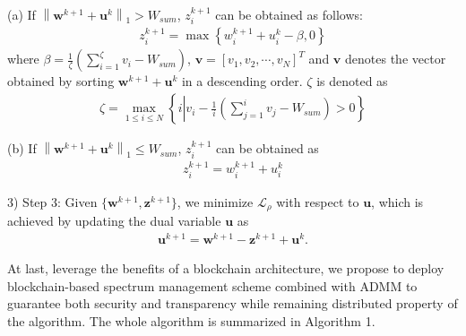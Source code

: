 \documentclass[journal]{IEEEtran}
\begin{document}
(a) If $\left\|\mathbf{w}^{k+1} + \mathbf{u}^k \right\|_1 > W_{sum}$, $z_i^{k+1}$ can be obtained as follows:
\begin{align} \label{q21}
z_i^{k+1} = \max\left\{w_i^{k+1} + u_i^k - \beta, 0\right\}
\end{align}
where $\beta = \frac{1}{\zeta}\left(\sum\limits_{i = 1}^{\zeta} v_i - W_{sum} \right)$, $\mathbf{v} = \left[v_1, v_2, \cdots, v_N\right]^T$ and $\mathbf{v}$ denotes the vector obtained by sorting $\mathbf{w}^{k+1} + \mathbf{u}^k$ in a descending order. $\zeta$ is denoted as 
\begin{align}
\zeta = \max_{1 \leq i \leq N} \left\{ i \left| v_i - \frac{1}{i}\left(\sum\limits_{j = 1}^{i} v_j - W_{sum}\right) > 0 \right. \right\}
\end{align}

(b) If $\left\|\mathbf{w}^{k+1} + \mathbf{u}^k \right\|_1 \leq W_{sum}$, $z_i^{k+1}$ can be obtained as
\begin{align}
z_i^{k+1} = w_i^{k+1} + u_i^k
\end{align}

3) Step 3: Given $\{\mathbf{w}^{k+1}, \mathbf{z}^{k+1}\}$, we minimize $\mathcal{L}_\rho$ with respect to $\mathbf{u}$, which is achieved
by updating the dual variable $\mathbf{u}$ as
\begin{align} \label{q24}
\mathbf{u}^{k+1} =\mathbf{w}^{k+1} - \mathbf{z}^{k+1} + \mathbf{u}^k.
\end{align}

At last, leverage the benefits
of a blockchain architecture, we propose to deploy blockchain-based spectrum management scheme combined with ADMM to guarantee both security and transparency while remaining distributed property of the algorithm. The whole algorithm is summarized in Algorithm 1.
\end{document}
